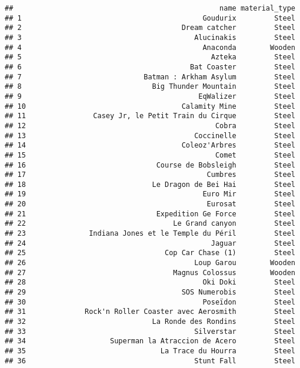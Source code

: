 \documentclass[
]{article}
\begin{document}
\begin{verbatim}
##                                                 name material_type
## 1                                           Goudurix         Steel
## 2                                      Dream catcher         Steel
## 3                                         Alucinakis         Steel
## 4                                           Anaconda        Wooden
## 5                                             Azteka         Steel
## 6                                        Bat Coaster         Steel
## 7                             Batman : Arkham Asylum         Steel
## 8                               Big Thunder Mountain         Steel
## 9                                          EqWalizer         Steel
## 10                                     Calamity Mine         Steel
## 11                Casey Jr, le Petit Train du Cirque         Steel
## 12                                             Cobra         Steel
## 13                                        Coccinelle         Steel
## 14                                     Coleoz'Arbres         Steel
## 15                                             Comet         Steel
## 16                               Course de Bobsleigh         Steel
## 17                                           Cumbres         Steel
## 18                              Le Dragon de Bei Hai         Steel
## 19                                          Euro Mir         Steel
## 20                                           Eurosat         Steel
## 21                               Expedition Ge Force         Steel
## 22                                   Le Grand canyon         Steel
## 23               Indiana Jones et le Temple du Péril         Steel
## 24                                            Jaguar         Steel
## 25                                 Cop Car Chase (1)         Steel
## 26                                        Loup Garou        Wooden
## 27                                   Magnus Colossus        Wooden
## 28                                          Oki Doki         Steel
## 29                                     SOS Numerobis         Steel
## 30                                          Poseïdon         Steel
## 31              Rock'n Roller Coaster avec Aerosmith         Steel
## 32                              La Ronde des Rondins         Steel
## 33                                        Silverstar         Steel
## 34                    Superman la Atraccion de Acero         Steel
## 35                                La Trace du Hourra         Steel
## 36                                        Stunt Fall         Steel

\end{verbatim}
\end{document}
